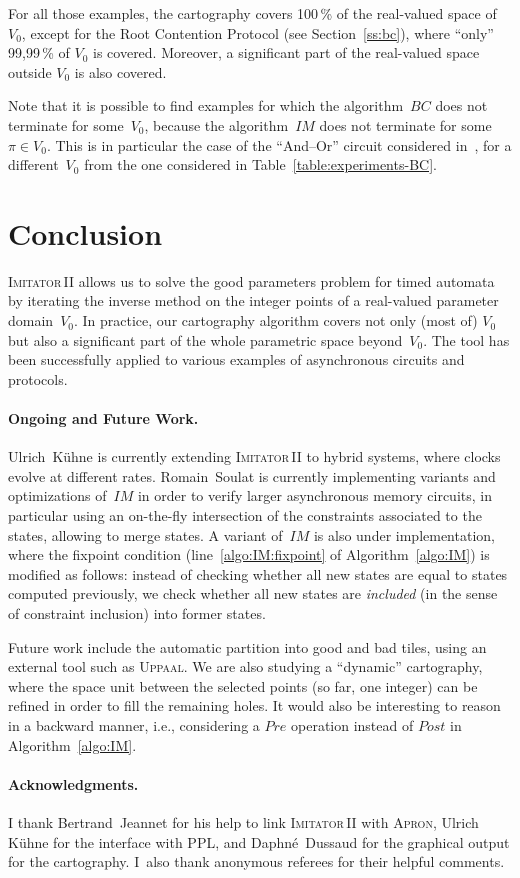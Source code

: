 \documentclass[submission,copyright,creativecommons]{eptcs}
\newcommand{\IM}{\mathit{IM}}
\newcommand{\BC}{\mathit{BC}}
\newcommand{\apron}{\textsc{Apron}}
\newcommand{\imitatordeux}{\textsc{Imitator}\,II}
\newcommand{\uppaal}{\textsc{Uppaal}}
\newcommand{\paragraphe}[1]{\paragraph{#1.}}
\begin{document}
For all those examples, the cartography covers 100\,\% of the real-valued space of $V_0$, except for the Root Contention Protocol (see Section~\ref{ss:bc}), where ``only'' 99,99\,\% of $V_0$ is covered.
Moreover, a significant part of the real-valued space outside $V_0$ is also covered.

Note that it is possible to find examples for which the algorithm~$\BC$ does not terminate for some~$V_0$, because the algorithm~$\IM$ does not terminate for some~$\pi \in V_0$.
This is in particular the case of the ``And--Or'' circuit considered in~\cite{cc05}, for a different~$V_0$ from the one considered in Table~\ref{table:experiments-BC}.



\section{Conclusion} \label{sec:conclusion}


\imitatordeux{} allows us to solve the good parameters problem for timed automata by iterating the inverse method on the integer points of a real-valued parameter domain~$V_0$.
In practice, our cartography algorithm covers not only (most of) $V_0$ but also a significant part of the whole parametric space beyond~$V_0$.
The tool has been successfully applied to various examples of asynchronous circuits and protocols.


\paragraphe{Ongoing and Future Work}
Ulrich~K\"uhne is currently extending \imitatordeux{} to hybrid systems, where clocks evolve at different rates.
Romain~Soulat is currently implementing variants and optimizations of~$\IM$ in order to verify larger asynchronous memory circuits, in particular using an on-the-fly intersection of the constraints associated to the states, allowing to merge states.
A variant of~$\IM$ is also under implementation, where the fixpoint condition (line~\ref{algo:IM:fixpoint} of Algorithm~\ref{algo:IM}) is modified as follows: instead of checking whether all new states are equal to states computed previously, we check whether all new states are \emph{included} (in the sense of constraint inclusion) into former states.


Future work include the automatic partition into good and bad tiles, using an external tool such as \uppaal{}. We are also studying a ``dynamic'' cartography, where the space unit between the selected points (so far, one integer) can be refined in order to fill the remaining holes.
It would also be interesting to reason in a backward manner, i.e., considering a $\mathit{Pre}$ operation instead of $\mathit{Post}$ in Algorithm~\ref{algo:IM}.






\paragraphe{Acknowledgments}
I thank Bertrand~Jeannet for his help to link \imitatordeux{} with \apron{}, Ulrich K\"uhne for the interface with PPL, and Daphn\'e~Dussaud for the graphical output for the cartography.
I~also thank anonymous referees for their helpful comments.


 
\end{document}
